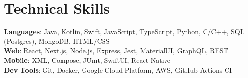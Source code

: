 \documentclass[letterpaper,11pt]{article}
\begin{document}
\section{Technical Skills}
\begin{itemize}[leftmargin=0.15in, label={}]
	\small{\item{
	      \textbf{Languages}{: Java, Kotlin, Swift, JavaScript, TypeScript, Python, C/C++, SQL (Postgres), MongoDB, HTML/CSS} \\
	      \textbf{Web}{: React, Next.js, Node.js, Express, Jest, MaterialUI, GraphQL, REST} \\
	      \textbf{Mobile}{: XML, Compose, JUnit, SwiftUI, React Native} \\
	      \textbf{Dev Tools}{: Git, Docker, Google Cloud Platform, AWS, GitHub Actions CI}
	      }}
\end{itemize}

\end{document}
